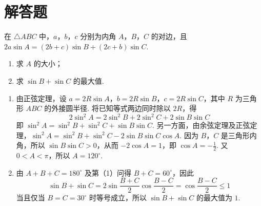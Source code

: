 \section{解答题}

\begin{problem}
在 \(\triangle ABC\) 中，\(a\)，\(b\)，\(c\) 分别为内角 \(A\)，\(B\)，\(C\) 的对边，且 \(2a \sin A = (2b + c) \sin B + (2c + b) \sin C\).

\begin{enumerate}
\item 求 \(A\) 的大小；
\item 求 \(\sin B + \sin C\) 的最大值.
\end{enumerate}
\end{problem}

\begin{solution}
\begin{enumerate}
\item 由正弦定理，设 \(a=2R\sin A\)，\(b=2R\sin B\)，\(c=2R\sin C\)，其中 \(R\) 为三角形 \(ABC\) 的外接圆半径. 将已知等式两边同时除以 \(2R\)，得
\[
2\sin ^2A=2\sin ^2B+2\sin ^2C+2\sin B\sin C
\]
即 \(\sin ^2A=\sin ^2B+\sin ^2C+\sin B\sin C\). 另一方面，由余弦定理及正弦定理，\(\sin ^2A=\sin ^2B+\sin ^2C-2\sin B\sin C\cos A\). 因为 \(B\)，\(C\) 是三角形内角，所以 \(\sin B\sin C>0\)，从而 \(-2\cos A=1\)，即 \(\cos A=-\frac{1}{2}\). 又 \(0<A<\pi\)，所以 \(A=120^{\circ}\).
\item 由 \(A+B+C=180^{\circ}\) 及第（1）问得 \(B+C=60^{\circ}\)，因此
\[
\sin B+\sin C=2\sin\frac{B+C}{2}\cos\frac{B-C}{2}=\cos\frac{B-C}{2}\leqslant1
\]
当且仅当 \(B=C=30^{\circ}\) 时等号成立，所以 \(\sin B+\sin C\) 的最大值为 \(1\).
\end{enumerate}
\end{solution}

